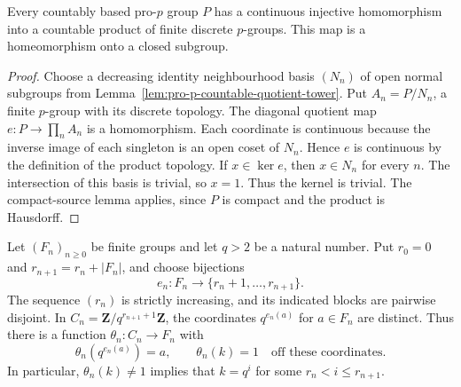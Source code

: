 \begin{lemma}
\label{lem:countable-pro-p-quotient-embedding}
\leanok
Every countably based pro-$p$ group $P$ has a continuous injective
homomorphism into a countable product of finite discrete $p$-groups.
This map is a homeomorphism onto a closed subgroup.
\end{lemma}

\begin{proof}
Choose a decreasing identity neighbourhood basis $(N_n)$ of open
normal subgroups from Lemma~\ref{lem:pro-p-countable-quotient-tower}.
Put $A_n=P/N_n$, a finite $p$-group with its discrete topology.
The diagonal quotient map $e:P\to\prod_n A_n$ is a homomorphism.
Each coordinate is continuous because the inverse image of each
singleton is an open coset of $N_n$. Hence $e$ is continuous by
the definition of the product topology.
If $x\in\ker e$, then $x\in N_n$ for every $n$.
The intersection of this basis is trivial, so $x=1$.
Thus the kernel is trivial. The compact-source lemma applies,
since $P$ is compact and the product is Hausdorff.
\end{proof}

\begin{lemma}
\label{lem:wreath-sparse-coordinates}
\leanok
Let $(F_n)_{n\ge0}$ be finite groups and let $q>2$ be a natural
number. Put $r_0=0$ and $r_{n+1}=r_n+|F_n|$, and choose bijections
\[
 e_n:F_n\longrightarrow\{r_n+1,\ldots,r_{n+1}\}.
\]
The sequence $(r_n)$ is strictly increasing, and its indicated
blocks are pairwise disjoint. In
$C_n=\mathbf Z/q^{r_{n+1}+1}\mathbf Z$, the coordinates
$q^{e_n(a)}$ for $a\in F_n$ are distinct. Thus there is a function
$\theta_n:C_n\to F_n$ with
\[
 \theta_n(q^{e_n(a)})=a,
 \qquad
 \theta_n(k)=1\quad\text{off these coordinates}.
\]
In particular, $\theta_n(k)\ne1$ implies that
$k=q^i$ for some $r_n<i\le r_{n+1}$.
\end{lemma}

